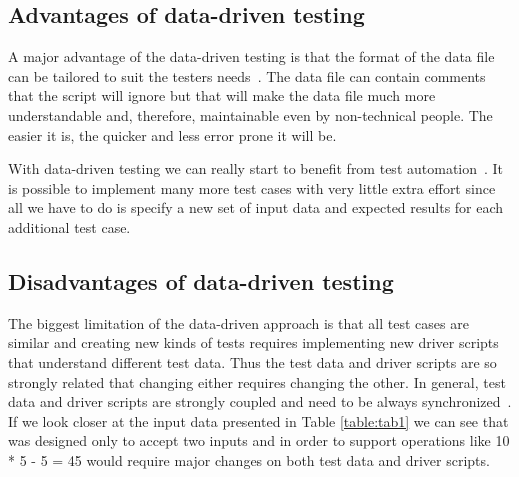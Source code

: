 \subsection{Advantages of data-driven testing}

A major advantage of the data-driven testing is that the format of the
data file can be tailored to suit the testers needs~\cite{Fewster99}. The data
file can contain comments that the script will ignore but that will make the
data file much more understandable and, therefore, maintainable even by
non-technical people. The easier it is, the quicker and less error prone it
will be.

With data-driven testing we can really start to benefit from test automation~\cite{Fewster99}.
It is possible to implement many more test cases with very little extra effort
since all we have to do is specify a new set of input data and expected results
for each additional test case.\\[1mm]


\subsection{Disadvantages of data-driven testing}

The biggest limitation of the data-driven approach is that all test cases are
similar and creating new kinds of tests requires implementing new driver scripts
that understand different test data. Thus the test data and driver scripts are
so strongly related that changing either requires changing the other. In general,
test data and driver scripts are strongly coupled and need to be always
synchronized~\cite{Fewster99}. If we look closer at the input data presented in
Table \ref{table:tab1} we can see that was designed only to accept two inputs
and in order to support operations like 10 * 5 - 5 = 45 would require major
changes on both test data and driver scripts.

